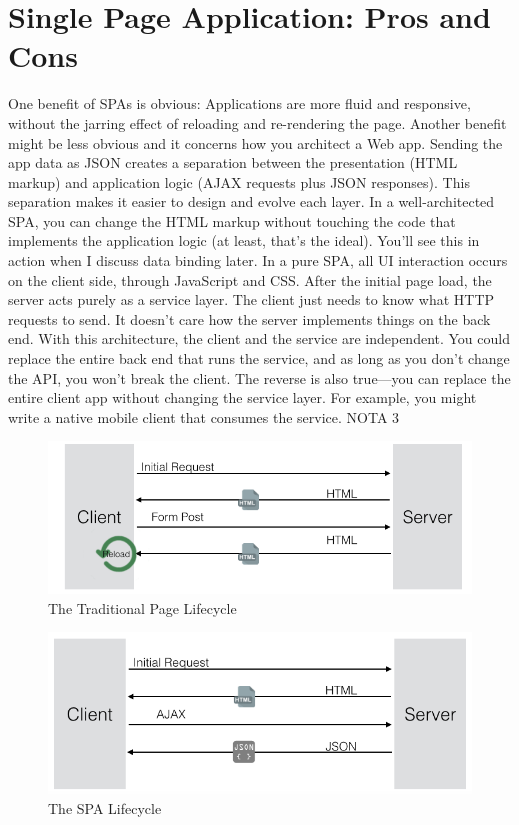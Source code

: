 \section{Single Page Application: Pros and Cons}
\label{sec:ARC_overview}

One benefit of SPAs is obvious: Applications are more fluid and responsive, without the jarring effect of reloading and re-rendering the page. Another benefit might be less obvious and it concerns how you architect a Web app. Sending the app data as JSON creates a separation between the presentation (HTML markup) and application logic (AJAX requests plus JSON responses).
This separation makes it easier to design and evolve each layer. In a well-architected SPA, you can change the HTML markup without touching the code that implements the application logic (at least, that’s the ideal). You’ll see this in action when I discuss data binding later.
In a pure SPA, all UI interaction occurs on the client side, through JavaScript and CSS. After the initial page load, the server acts purely as a service layer. The client just needs to know what HTTP requests to send. It doesn’t care how the server implements things on the back end.
With this architecture, the client and the service are independent. You could replace the entire back end that runs the service, and as long as you don’t change the API, you won’t break the client. The reverse is also true—you can replace the entire client app without changing the service layer. For example, you might write a native mobile client that consumes the service. NOTA 3

\begin {figure}[h]
\graphicspath{{images/chapter_arc/}}
\includegraphics[width=\textwidth]{trad_life}
\caption{The Traditional Page Lifecycle}
\end {figure}


\begin {figure}[h]
\graphicspath{{images/chapter_arc/}}
\includegraphics[width=\textwidth]{spa_life}
\caption{The SPA Lifecycle}
\end {figure}



